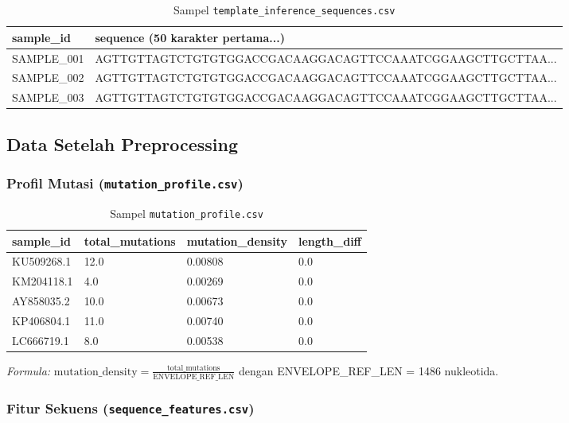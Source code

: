 \documentclass[12pt,a4paper]{article}
\begin{document}
\begin{table}[h]
\centering
\caption{Sampel \texttt{template\_inference\_sequences.csv}}
\small
\begin{tabular}{@{}ll@{}}
\toprule
\textbf{sample\_id} & \textbf{sequence} (50 karakter pertama...) \\
\midrule
SAMPLE\_001 & AGTTGTTAGTCTGTGTGGACCGACAAGGACAGTTCCAAATCGGAAGCTTGCTTAA... \\
SAMPLE\_002 & AGTTGTTAGTCTGTGTGGACCGACAAGGACAGTTCCAAATCGGAAGCTTGCTTAA... \\
SAMPLE\_003 & AGTTGTTAGTCTGTGTGGACCGACAAGGACAGTTCCAAATCGGAAGCTTGCTTAA... \\
\bottomrule
\end{tabular}
\end{table}

\subsection{Data Setelah Preprocessing}

\subsubsection{Profil Mutasi (\texttt{mutation\_profile.csv})}

\begin{table}[h]
\centering
\caption{Sampel \texttt{mutation\_profile.csv}}
\small
\begin{tabular}{@{}llll@{}}
\toprule
\textbf{sample\_id} & \textbf{total\_mutations} & \textbf{mutation\_density} & \textbf{length\_diff} \\
\midrule
KU509268.1 & 12.0 & 0.00808 & 0.0 \\
KM204118.1 & 4.0 & 0.00269 & 0.0 \\
AY858035.2 & 10.0 & 0.00673 & 0.0 \\
KP406804.1 & 11.0 & 0.00740 & 0.0 \\
LC666719.1 & 8.0 & 0.00538 & 0.0 \\
\bottomrule
\end{tabular}
\end{table}

\textit{Formula:} $\text{mutation\_density} = \frac{\text{total\_mutations}}{\text{ENVELOPE\_REF\_LEN}}$ dengan ENVELOPE\_REF\_LEN = 1486 nukleotida.

\subsubsection{Fitur Sekuens (\texttt{sequence\_features.csv})}
\end{document}

